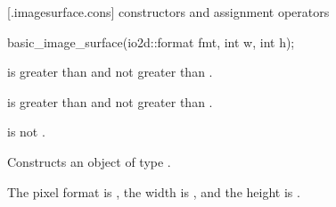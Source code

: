  [\iotwod.imagesurface.cons] { constructors and assignment operators}

%
\begin{itemdecl}
basic_image_surface(io2d::format fmt, int w, int h);
\end{itemdecl}
\begin{itemdescr}
\pnum
\requires
{} is greater than  and not greater than .

\pnum
{} is greater than  and not greater than .

\pnum
{} is not .

\pnum
\effects
Constructs an object of type .

\pnum
The pixel format is , the width is , and the height is .
\end{itemdescr}

